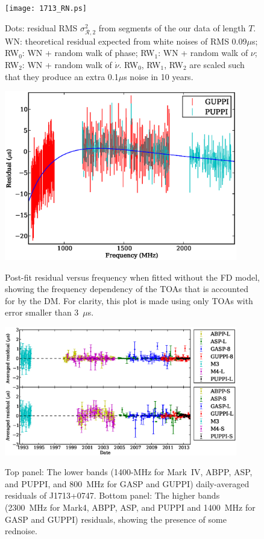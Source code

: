 \documentclass[12pt,preprint]{aastex}
\newcommand{\msR}{\mathscr{R}}
\begin{document}
\begin{figure}
\texttt{[image: 1713\_RN.ps]} \\ 
\caption{\label{fig:TN}
Dots: residual RMS $\sigma^2_{\msR,2}$ from segments of the our data of length $T$.  
WN: theoretical residual expected from white noises of RMS 0.09$\mu$s; RW$_0$:
WN + random walk of phase; RW$_1$: WN + random walk of $\nu$; RW$_2$: WN +
random walk of $\dot{\nu}$. RW$_0$, RW$_1$, RW$_2$ are scaled such that they
produce an extra 0.1$\mu$s noise in 10 years.
} 
\end{figure} 

\begin{figure}
\includegraphics[width=4in]{FD.ps} \\ 
\caption {\label{fig:FD} Post-fit residual versus frequency when fitted
without the FD model, showing the frequency dependency of the TOAs that is 
accounted for by the DM. For
clarity, this plot is made using only TOAs with error smaller than 3~$\mu$s.} 
\end{figure} 

\begin{figure}
\includegraphics[width=4in]{residual.eps} \\ 
\caption {\label{fig:res} Top panel: The lower bands (1400-MHz for
Mark~IV, ABPP, ASP, and PUPPI, and 800~MHz for GASP and GUPPI) daily-averaged residuals of
J1713+0747. Bottom panel: The higher bands (2300~MHz for Mark4, ABPP, ASP, and PUPPI and
1400~MHz for GASP and GUPPI) residuals, showing the presence of some rednoise.} 
\end{figure} 
\end{document}
